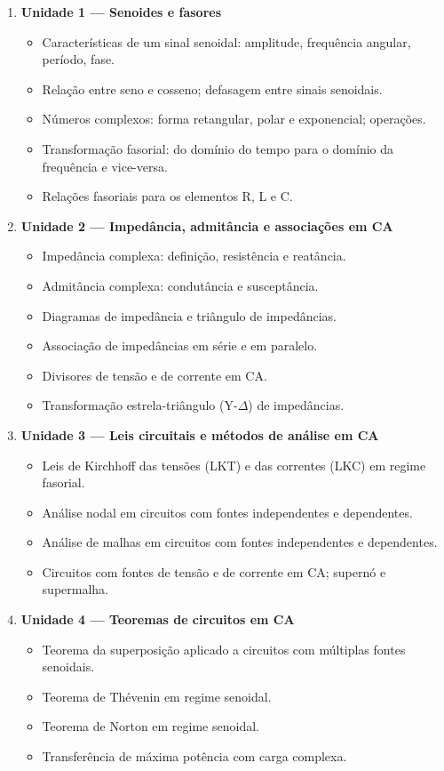 \documentclass[oneside,a4paper,12pt]{article}
\begin{document}
  \begin{enumerate}
    \item \textbf{Unidade 1 --- Senoides e fasores}
    \begin{itemize}
      \item Características de um sinal senoidal: amplitude, frequência angular, período, fase.
      \item Relação entre seno e cosseno; defasagem entre sinais senoidais.
      \item Números complexos: forma retangular, polar e exponencial; operações.
      \item Transformação fasorial: do domínio do tempo para o domínio da frequência e vice-versa.
      \item Relações fasoriais para os elementos R, L e C.
    \end{itemize}

    \item \textbf{Unidade 2 --- Impedância, admitância e associações em CA}
    \begin{itemize}
      \item Impedância complexa: definição, resistência e reatância.
      \item Admitância complexa: condutância e susceptância.
      \item Diagramas de impedância e triângulo de impedâncias.
      \item Associação de impedâncias em série e em paralelo.
      \item Divisores de tensão e de corrente em CA.
      \item Transformação estrela-triângulo (Y-$\Delta$) de impedâncias.
    \end{itemize}

    \item \textbf{Unidade 3 --- Leis circuitais e métodos de análise em CA}
    \begin{itemize}
      \item Leis de Kirchhoff das tensões (LKT) e das correntes (LKC) em regime fasorial.
      \item Análise nodal em circuitos com fontes independentes e dependentes.
      \item Análise de malhas em circuitos com fontes independentes e dependentes.
      \item Circuitos com fontes de tensão e de corrente em CA; supernó e supermalha.
    \end{itemize}

    \item \textbf{Unidade 4 --- Teoremas de circuitos em CA}
    \begin{itemize}
      \item Teorema da superposição aplicado a circuitos com múltiplas fontes senoidais.
      \item Teorema de Thévenin em regime senoidal.
      \item Teorema de Norton em regime senoidal.
      \item Transferência de máxima potência com carga complexa.
    \end{itemize}


\end{enumerate}
\end{document}
